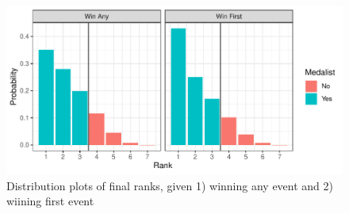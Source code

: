 \documentclass[12pt]{article}
\begin{document}
\begin{table}[H]

\caption{\label{tab:unnamed-chunk-9}This table shows every possible final rank obtained from simulations for a climber given that a they win at least one discipline or finish first in the first discipline. For each rank, information on the number of times that climbers finish at the given rank, the probability of finishing at exactly the given rank, and the probability of finishing at or below the given rank are included.}
\centering
{}
\end{table}

\begin{figure}

{\centering \includegraphics{draft_files/figure-latex/unnamed-chunk-10-1} 

}

\caption{Distribution plots of final ranks, given 1) winning any event and 2) wiining first event}\label{fig:unnamed-chunk-10}
\end{figure}
\end{document}

